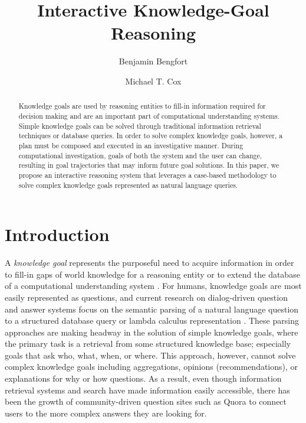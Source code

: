 \documentclass{llncs}
\begin{document}
\title{Interactive Knowledge-Goal Reasoning}

\author{Benjamin Bengfort \and Michael T. Cox}


\maketitle


\begin{abstract}
Knowledge goals are used by reasoning entities to fill-in information required for decision making and are an important part of computational understanding systems. Simple knowledge goals can be solved through traditional information retrieval techniques or database queries. In order to solve complex knowledge goals, however, a plan must be composed and executed in an investigative manner. During computational investigation, goals of both the system and the user can change, resulting in goal trajectories that may inform future goal solutions. In this paper, we propose an interactive reasoning system that leverages a case-based methodology to solve complex knowledge goals represented as natural language queries.
\end{abstract}

\section{Introduction}

A \textit{knowledge goal} represents the purposeful need to acquire information in order to fill-in gaps of world knowledge for a reasoning entity or to extend the database of a computational understanding system \cite{ram_goal-based_1991}. For humans, knowledge goals are most easily represented as questions, and current research on dialog-driven question and answer systems focus on the semantic parsing of a natural language question to a structured database query \cite{yahya_natural_2012} or lambda calculus representation \cite{berant_semantic_2013}. These parsing approaches are making headway in the solution of simple knowledge goals, where the primary task is a retrieval from some structured knowledge base; especially goals that ask who, what, when, or where. This approach, however, cannot solve complex knowledge goals including aggregations, opinions (recommendations), or explanations for why or how questions. As a result, even though information retrieval systems and search have made information easily accessible, there has been the growth of community-driven question sites such as Quora \cite{wang_wisdom_2013} to connect users to the more complex answers they are looking for.
\end{document}
